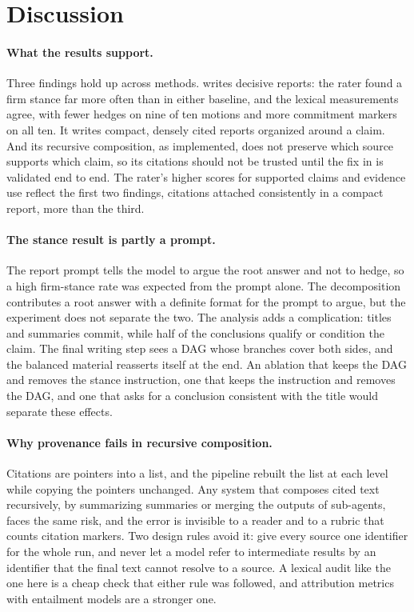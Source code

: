 \section{Discussion}
\label{sec:discussion}

\paragraph{What the results support.}
Three findings hold up across methods. \sys{} writes decisive reports: the rater found a firm stance far more often than in either baseline, and the lexical measurements agree, with fewer hedges on nine of ten motions and more commitment markers on all ten. It writes compact, densely cited reports organized around a claim. And its recursive composition, as implemented, does not preserve which source supports which claim, so its citations should not be trusted until the fix in  is validated end to end. The rater's higher scores for supported claims and evidence use reflect the first two findings, citations attached consistently in a compact report, more than the third.

\paragraph{The stance result is partly a prompt.}
The report prompt tells the model to argue the root answer and not to hedge, so a high firm-stance rate was expected from the prompt alone. The decomposition contributes a root answer with a definite format for the prompt to argue, but the experiment does not separate the two. The analysis adds a complication: titles and summaries commit, while half of the conclusions qualify or condition the claim. The final writing step sees a DAG whose branches cover both sides, and the balanced material reasserts itself at the end. An ablation that keeps the DAG and removes the stance instruction, one that keeps the instruction and removes the DAG, and one that asks for a conclusion consistent with the title would separate these effects.

\paragraph{Why provenance fails in recursive composition.}
Citations are pointers into a list, and the pipeline rebuilt the list at each level while copying the pointers unchanged. Any system that composes cited text recursively, by summarizing summaries or merging the outputs of sub-agents, faces the same risk, and the error is invisible to a reader and to a rubric that counts citation markers. Two design rules avoid it: give every source one identifier for the whole run, and never let a model refer to intermediate results by an identifier that the final text cannot resolve to a source. A lexical audit like the one here is a cheap check that either rule was followed, and attribution metrics with entailment models \citep{rashkin2023ais, gao2023alce} are a stronger one.

